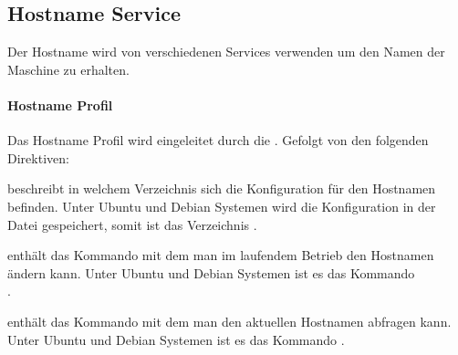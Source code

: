 \subsection{Hostname Service}

\begin{multicols}{2}

Der Hostname wird von verschiedenen Services verwenden um den Namen der Maschine
zu erhalten.

\paragraph{Hostname Profil}

Das Hostname Profil wird eingeleitet durch die . Gefolgt von
den folgenden Direktiven:

\begin{asparadesc}
\item[\directive{configuration\_directory}] beschreibt in welchem Verzeichnis
sich die Konfiguration für den Hostnamen befinden. Unter Ubuntu und Debian
Systemen wird die Konfiguration in der Datei  gespeichert,
somit ist das Verzeichnis .
\item[\directive{restart\_command}] enthält das Kommando mit dem man im
laufendem Betrieb den Hostnamen ändern kann.  Unter Ubuntu und Debian
Systemen ist es das Kommando\\
.
\item[\directive{status\_command}] enthält das Kommando mit dem man den
aktuellen Hostnamen abfragen kann. Unter Ubuntu und Debian Systemen ist es das
Kommando .
\end{asparadesc}

\end{multicols}

